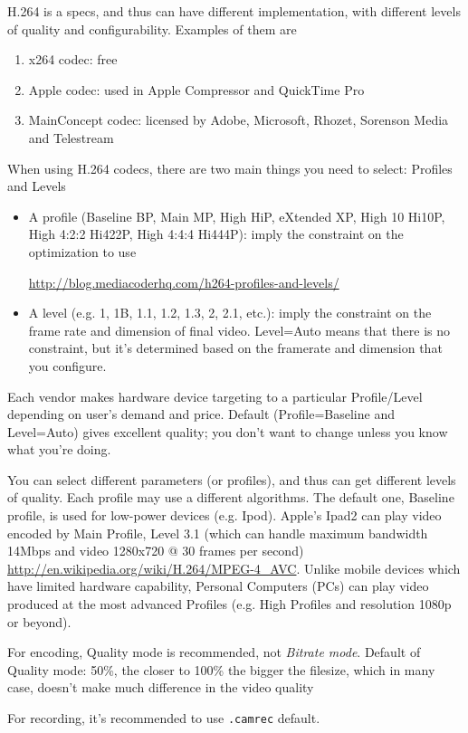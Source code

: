 H.264 is a specs, and thus can have different implementation, with different
levels of quality and configurability. Examples of them are
\begin{enumerate}
  \item x264 codec: free
  \item Apple codec: used in Apple Compressor and QuickTime Pro
  \item MainConcept codec: licensed by Adobe, Microsoft, Rhozet, Sorenson Media
  and Telestream 
\end{enumerate}

When using H.264 codecs, there are two main things you need to select: Profiles
and Levels
\begin{itemize}
  \item A profile (Baseline BP, Main MP, High HiP, eXtended XP, High 10 Hi10P,
  High 4:2:2 Hi422P, High 4:4:4 Hi444P): imply the constraint on the optimization to use
  
  \url{http://blog.mediacoderhq.com/h264-profiles-and-levels/}
  
  \item A level (e.g. 1, 1B, 1.1, 1.2, 1.3, 2, 2.1, etc.): imply the constraint
  on the frame rate and dimension of final video. Level=Auto means that there is
  no constraint, but it's determined based on the framerate and dimension that
  you configure.
\end{itemize}
Each vendor makes hardware device targeting to a particular Profile/Level
depending on user's demand and price. Default (Profile=Baseline and Level=Auto)
gives excellent quality; you don't want to change unless you know what you're
doing.

You can select different parameters (or profiles), and thus can get different
levels of quality. Each profile may use a different algorithms. The default one,
Baseline profile, is used for low-power devices (e.g. Ipod).
Apple's Ipad2 can play video encoded by Main Profile, Level 3.1 (which can
handle maximum bandwidth 14Mbps and video 1280x720 @ 30 frames per second)
\url{http://en.wikipedia.org/wiki/H.264/MPEG-4_AVC}.
Unlike mobile devices which have limited hardware capability, Personal Computers
(PCs) can play video produced at the most advanced Profiles (e.g. High Profiles
and resolution 1080p or beyond).


\begin{framed}
For encoding, Quality mode is recommended, not {\it Bitrate mode}. Default of
Quality mode: 50\%, the closer to 100\% the bigger the filesize, which in many
case, doesn't make much difference in the video quality

For recording, it's recommended to use \verb!.camrec! default.
\end{framed}

